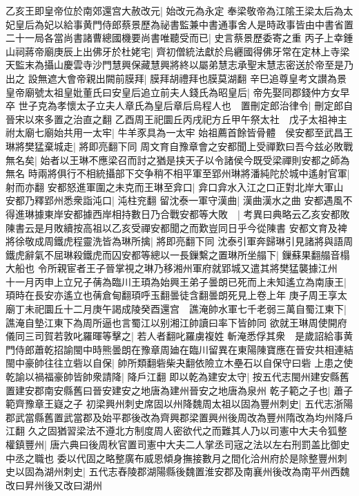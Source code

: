 乙亥王即皇帝位於南郊還宫大赦改元|{
	始改元為永定}
奉梁敬帝為江隂王梁太后為太妃皇后為妃以給事黄門侍郎蔡景歷為祕書監兼中書通事舍人是時政事皆由中書省置二十一局各當尚書諸曹總國機要尚書唯聽受而已|{
	史言蔡景歷委寄之重}
丙子上幸鍾山祠蔣帝廟庚辰上出佛牙於杜姥宅|{
	齊初僧統法獻於烏纒國得佛牙常在定林上寺梁天監末為攝山慶雲寺沙門慧興保藏慧興將終以屬弟慧志承聖末慧志密送於帝至是乃出之}
設無遮大會帝親出闕前膜拜|{
	膜拜胡禮拜也膜莫湖翻}
辛巳追尊皇考文讃為景皇帝廟號太祖皇妣董氏曰安皇后追立前夫人錢氏為昭皇后|{
	帝先娶同郡錢仲方女早卒}
世子克為孝懷太子立夫人章氏為皇后章后烏程人也　置刪定郎治律令|{
	刪定郎自晉宋以來多置之治直之翻}
乙酉周王祀圜丘丙戌祀方丘甲午祭太社　戊子太祖神主祔太廟七廟始共用一太牢|{
	牛羊豕具為一太牢}
始祖薦首餘皆骨體　侯安都至武昌王琳將樊猛棄城走|{
	將即亮翻下同}
周文育自豫章會之安都聞上受禪歎曰吾今兹必敗戰無名矣|{
	始者以王琳不應梁召而討之猶是挟天子以令諸侯今既受梁禪則安都之師為無名}
時兩將俱行不相統攝部下交争稍不相平軍至郢州琳將潘純陀於城中遙射官軍|{
	射而亦翻}
安都怒進軍圍之未克而王琳至弇口|{
	弇口弇水入江之口正對北岸大軍山}
安都乃釋郢州悉衆詣沌口|{
	沌柱兖翻}
留沈泰一軍守漢曲|{
	漢曲漢水之曲}
安都遇風不得進琳據東岸安都據西岸相持數日乃合戰安都等大敗　|{
	考異曰典略云乙亥安都敗陳書云是月敗續按高祖以乙亥受禪安都聞之而歎豈同日乎今從陳書}
安都文育及裨將徐敬成周鐵虎程靈洗皆為琳所擒|{
	將即亮翻下同}
沈泰引軍奔歸琳引見諸將與語周鐵虎辭氣不屈琳殺鐵虎而囚安都等總以一長鏁繫之置琳所坐䑽下|{
	鏁蘇果翻䑽音榻大船也}
令所親宦者王子晉掌視之琳乃移湘州軍府就郢城又遣其將樊猛襲據江州　十一月丙申上立兄子蒨為臨川王頊為始興王弟子曇朗已死而上未知遙立為南康王|{
	頊時在長安亦遙立也蒨倉甸翻頊呼玉翻曇徒含翻曇朗死見上卷上年}
庚子周王享太廟丁未祀圜丘十二月庚午謁成陵癸酉還宫　譙淹帥水軍七千老弱三萬自蜀江東下|{
	譙淹自墊江東下為周所逼也言蜀江以别湘江帥讀曰率下皆帥同}
欲就王琳周使開府儀同三司賀若敦叱羅暉等擊之|{
	若人者翻叱羅虜複姓}
斬淹悉俘其衆　是歲詔給事黄門侍郎蕭乾招諭閩中時熊曇朗在豫章周廸在臨川留異在東陽陳寶應在晉安共相連結閩中豪帥往往立砦以自保|{
	帥所類翻砦柴夬翻依險立木壘石以自保守曰砦}
上患之使乾諭以禍福豪帥皆帥衆請降|{
	降戶江翻}
即以乾為建安太守|{
	按五代志閩州建安縣舊置建安郡南安縣舊曰晉安建安之地唐為建州晉安之地唐為泉州}
乾子範之子也|{
	蕭子範齊豫章王嶷之子}
初梁興州刺史席固以州降魏周太祖以固為豐州刺史|{
	五代志浙陽郡武當縣舊置武當郡及始平郡後改為齊興郡梁置興州後周改為豐州隋改為均州降戶江翻}
久之固猶習梁法不遵北方制度周人密欲代之而難其人乃以司憲中大夫令狐整權鎮豐州|{
	唐六典曰後周秋官置司憲中大夫二人掌丞司宼之法以左右刑罰盖比御史中丞之職也}
委以代固之略整廣布威恩傾身撫接數月之間化洽州府於是除整豐州刺史以固為湖州刺史|{
	五代志舂陵郡湖陽縣後魏置淮安郡及南襄州後改為南平州西魏改曰昇州後又改曰湖州}
